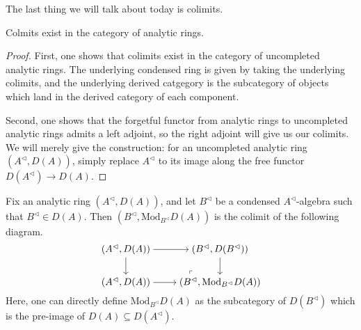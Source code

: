 \documentclass{article}
\begin{document}
The last thing we will talk about today is colimits.
\begin{theorem}
	Colmits exist in the category of analytic rings.
\end{theorem}
\begin{proof}
	First, one shows that colimits exist in the category of uncompleted analytic rings. The underlying condensed ring is given by taking the underlying colimits, and the underlying derived catgegory is the subcategory of objects which land in the derived category of each component.

	Second, one shows that the forgetful functor from analytic rings to uncompleted analytic rings admits a left adjoint, so the right adjoint will give us our colimits. We will merely give the construction: for an uncompleted analytic ring $(A^\vartriangleleft,D(A))$, simply replace $A^\vartriangleleft$ to its image along the free functor $D(A^\vartriangleleft)\to D(A)$.
\end{proof}
\begin{example}
	Fix an analytic ring $(A^\vartriangleleft,D(A))$, and let $B^\vartriangleleft$ be a condensed $A^\vartriangleleft$-algebra such that $B^\vartriangleleft\in D(A)$. Then $(B^\vartriangleleft,\mathrm{Mod}_{B^\vartriangleleft}D(A))$ is the colimit of the following diagram.
	\[\begin{tikzcd}[cramped]
		{\left(A^\vartriangleleft,D(A)\right)} & {\left(B^\vartriangleleft,D(B^\vartriangleleft)\right)} \\
		{(A^\vartriangleleft,D(A))} & {(B^\vartriangleleft,\mathrm{Mod}_{B^\vartriangleleft}D(A))}
		\arrow[from=1-1, to=1-2]
		\arrow[from=1-1, to=2-1]
		\arrow[from=1-2, to=2-2]
		\arrow[from=2-1, to=2-2]
		\arrow["\lrcorner"{anchor=center, pos=0.125, rotate=180}, draw=none, from=2-2, to=1-1]
	\end{tikzcd}\]
	Here, one can directly define $\mathrm{Mod}_{B^\vartriangleleft}D(A)$ as the subcategory of $D(B^\vartriangleleft)$ which is the pre-image of $D(A)\subseteq D(A^\vartriangleleft)$.
\end{example}
\end{document}
